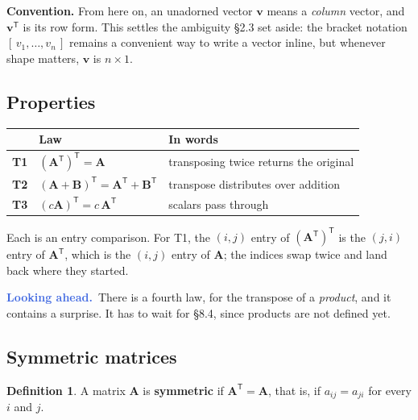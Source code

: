 \documentclass[11pt]{article}
\theoremstyle{plain}
\theoremstyle{definition}
\newtheorem{defn}{Definition}[section]
\theoremstyle{remark}
\newcommand{\lookahead}{\par\smallskip\noindent
  \textbf{\sffamily\textcolor{RoyalBlue}{Looking ahead.}}\ \ignorespaces}
\newcommand{\vc}[1]{\mathbf{#1}}        %
\newcommand{\mt}[1]{\mathbf{#1}}        %
\newcommand{\T}{^{\mathsf{T}}}          %
\begin{document}
\medskip
\noindent\textbf{Convention.} From here on, an unadorned vector $\vc{v}$ means a
\emph{column} vector, and $\vc{v}\T$ is its row form. This settles the ambiguity
\S2.3 set aside: the bracket notation $[\,v_1,\dots,v_n\,]$ remains a convenient
way to write a vector inline, but whenever shape matters, $\vc{v}$ is $n\times1$.

\subsection{Properties}
\begin{center}
\renewcommand{\arraystretch}{1.4}
\begin{tabular}{@{}l l l@{}}
\toprule
 & \textbf{Law} & \textbf{In words} \\
\midrule
\textbf{T1} & $(\mt{A}\T)\T=\mt{A}$
            & transposing twice returns the original \\
\textbf{T2} & $(\mt{A}+\mt{B})\T=\mt{A}\T+\mt{B}\T$
            & transpose distributes over addition \\
\textbf{T3} & $(c\mt{A})\T=c\,\mt{A}\T$
            & scalars pass through \\
\bottomrule
\end{tabular}
\end{center}

\noindent Each is an entry comparison. For T1, the $(i,j)$ entry of
$(\mt{A}\T)\T$ is the $(j,i)$ entry of $\mt{A}\T$, which is the $(i,j)$ entry of
$\mt{A}$; the indices swap twice and land back where they started.

\lookahead There is a fourth law, for the transpose of a \emph{product}, and it
contains a surprise. It has to wait for \S8.4, since products are not defined
yet.

\subsection{Symmetric matrices}
\begin{defn}
A matrix $\mt{A}$ is \textbf{symmetric} if $\mt{A}\T=\mt{A}$, that is, if
$a_{ij}=a_{ji}$ for every $i$ and $j$.
\end{defn}
\end{document}
